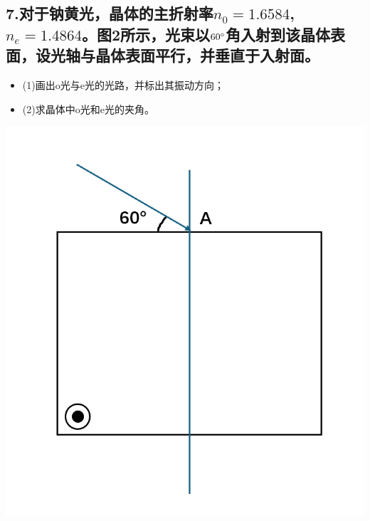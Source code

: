 \documentclass[11pt,a4paper]{article}
\begin{document}
    \subsection*{7.对于钠黄光，晶体的主折射率$n_0=1.6584$,$n_e=1.4864$。图2所示，光束以$60\degree$角入射到该晶体表面，设光轴与晶体表面平行，并垂直于入射面。}
    \begin{itemize}
        \vspace{0mm}
        \item (1)画出o光与e光的光路，并标出其振动方向；
        \vspace{0mm}
        \item (2)求晶体中o光和e光的夹角。
        \vspace{0mm}
    \end{itemize}
    \includegraphics[scale=0.5]{2.jpg}%
    \vspace{15mm}
\end{document}
